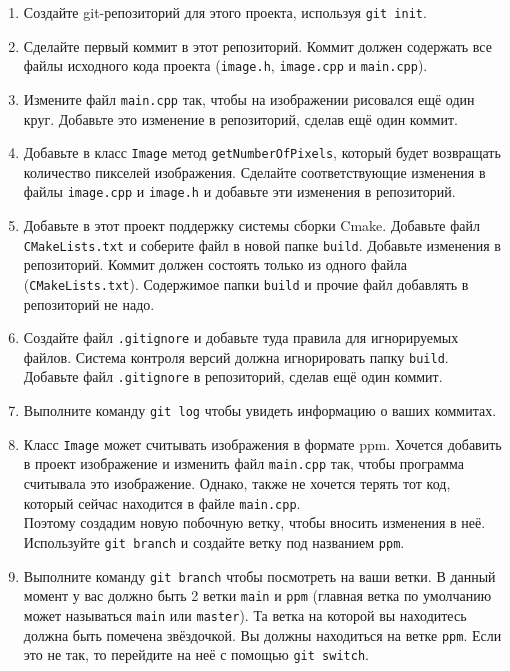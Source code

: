 \documentclass{article}
\begin{document}
\begin{enumerate}
\item Создайте git-репозиторий для этого проекта, используя \texttt{git init}.
\item Сделайте первый коммит в этот репозиторий. Коммит должен содержать все файлы исходного кода проекта (\texttt{image.h}, \texttt{image.cpp} и \texttt{main.cpp}).
\item Измените файл \texttt{main.cpp} так, чтобы на изображении рисовался ещё один круг. Добавьте это изменение в репозиторий, сделав ещё один коммит.
\item Добавьте в класс \texttt{Image} метод \texttt{getNumberOfPixels}, который будет возвращать количество пикселей изображения. Сделайте соответствующие изменения в файлы \texttt{image.cpp} и \texttt{image.h} и добавьте эти изменения в репозиторий.
\item Добавьте в этот проект поддержку системы сборки Cmake. Добавьте файл \texttt{CMakeLists.txt} и соберите файл в новой папке \texttt{build}. Добавьте изменения в репозиторий. Коммит должен состоять только из одного файла (\texttt{CMakeLists.txt}). Содержимое папки \texttt{build} и прочие файл добавлять в репозиторий не надо.
\item Создайте файл \texttt{.gitignore} и добавьте туда правила для игнорируемых файлов. Система контроля версий должна игнорировать папку \texttt{build}. Добавьте файл \texttt{.gitignore} в репозиторий, сделав ещё один коммит.
\item Выполните команду \texttt{git log} чтобы увидеть информацию о ваших коммитах.

\item Класс \texttt{Image} может считывать изображения в формате ppm. Хочется добавить в проект изображение и изменить файл \texttt{main.cpp} так, чтобы программа считывала это изображение. Однако, также не хочется терять тот код, который сейчас находится в файле \texttt{main.cpp}. \\
Поэтому создадим новую побочную ветку, чтобы вносить изменения в неё. Используйте \texttt{git branch} и создайте ветку под названием \texttt{ppm}. 

\item Выполните команду \texttt{git branch} чтобы посмотреть на ваши ветки. В данный момент у вас должно быть 2 ветки \texttt{main} и \texttt{ppm} (главная ветка по умолчанию может называться \texttt{main} или \texttt{master}). Та ветка на которой вы находитесь должна быть помечена звёздочкой. Вы должны находиться на ветке \texttt{ppm}. Если это не так, то перейдите на неё с помощью \texttt{git switch}.


\end{enumerate}
\end{document}
